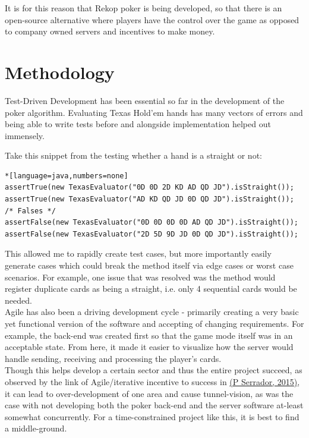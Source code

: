 \documentclass[11pt]{article}
\begin{document}
It is for this reason that Rekop poker is being developed, so that there is an open-source alternative where players have the control over the game as opposed to company owned servers and incentives to make money. 

\newpage
\section{Methodology}

Test-Driven Development has been essential so far in the development of the poker algorithm. Evaluating Texas Hold'em hands has many vectors of errors and being able to write tests before and alongside implementation helped out immensely. 

Take this snippet from the testing whether a hand is a straight or not: 

\begin{lstlisting}*[language=java,numbers=none]
assertTrue(new TexasEvaluator("0D 0D 2D KD AD QD JD").isStraight());
assertTrue(new TexasEvaluator("AD KD QD JD 0D QD JD").isStraight());
/* Falses */ 
assertFalse(new TexasEvaluator("0D 0D 0D 0D AD QD JD").isStraight());
assertFalse(new TexasEvaluator("2D 5D 9D JD 0D QD JD").isStraight());

\end{lstlisting}

This allowed me to rapidly create test cases, but more importantly easily generate cases which could break the method itself via edge cases or worst case scenarios. For example, one issue that was resolved was the method would register duplicate cards as being a straight, i.e. only 4 sequential cards would be needed. \\

Agile has also been a driving development cycle - primarily creating a very basic yet functional version of the software and accepting of changing requirements. For example, the back-end was created first so that the game mode itself was in an acceptable state. From here, it made it easier to visualize how the server would handle sending, receiving and processing the player's cards. \\

Though this helps develop a certain sector and thus the entire project succeed, as observed by the link of Agile/iterative incentive to success in \hyperlink{agile_success}{(P Serrador, 2015)}, it can lead to over-development of one area and cause tunnel-vision, as was the case with not developing both the poker back-end and the server software at-least somewhat concurrently. For a time-constrained project like this, it is best to find a middle-ground.
\end{document}
